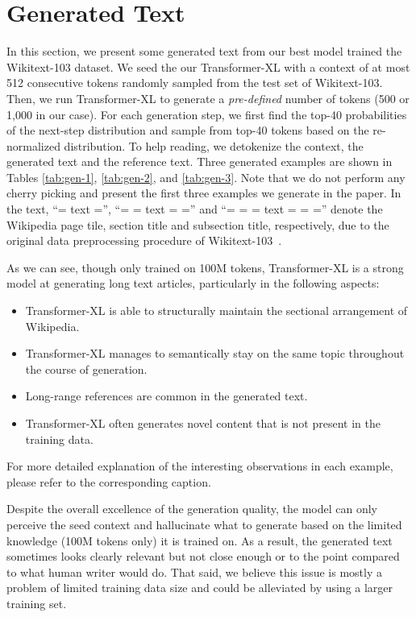 \documentclass[11pt,a4paper]{article}
\begin{document}
\section{Generated Text} \label{sec:gen}
In this section, we present some generated text from our best model trained the Wikitext-103 dataset.
We seed the our Transformer-XL with a context of at most 512 consecutive tokens randomly sampled from the test set of Wikitext-103. Then, we run Transformer-XL to generate a \textit{pre-defined} number of tokens (500 or 1,000 in our case). For each generation step, we first find the top-40 probabilities of the next-step distribution and sample from top-40 tokens based on the re-normalized distribution.
To help reading, we detokenize the context, the generated text and the reference text. Three generated examples are shown in Tables \ref{tab:gen-1}, \ref{tab:gen-2}, and \ref{tab:gen-3}. Note that we do not perform any cherry picking and present the first three examples we generate in the paper.
In the text, ``= text ='', ``= = text = ='' and ``= = = text = = ='' denote the Wikipedia page tile, section title and subsection title, respectively, due to the original data preprocessing procedure of Wikitext-103~\cite{merity2016pointer}. 



As we can see, though only trained on 100M tokens, Transformer-XL is a strong model at generating long text articles, particularly in the following aspects:
\begin{itemize}[topsep=0em,itemsep=0em,parsep=0.2em]
	\item Transformer-XL is able to structurally maintain the sectional arrangement of Wikipedia.
	\item Transformer-XL manages to semantically stay on the same topic throughout the course of generation.
	\item Long-range references are common in the generated text.
	\item Transformer-XL often generates novel content that is not present in the training data.
\end{itemize}
For more detailed explanation of the interesting observations in each example, please refer to the corresponding caption.

Despite the overall excellence of the generation quality, the model can only perceive the seed context and hallucinate what to generate based on the limited knowledge (100M tokens only) it is trained on. As a result, the generated text sometimes looks clearly relevant but not close enough or to the point compared to what human writer would do. 
That said, we believe this issue is mostly a problem of limited training data size and could be alleviated by using a larger training set.
\end{document}
